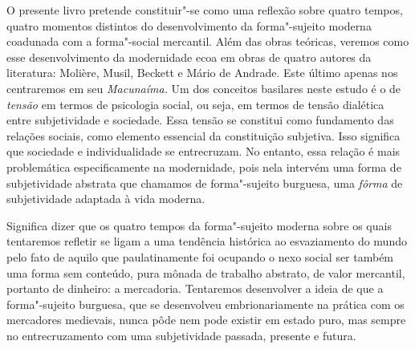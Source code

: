 O presente livro pretende constituir"-se como uma reflexão sobre quatro
tempos, quatro momentos distintos do desenvolvimento da forma"-sujeito
moderna coadunada com a forma"-social mercantil. Além das obras teóricas,
veremos como esse desenvolvimento da modernidade ecoa em obras de quatro
autores da literatura: Molière, Musil, Beckett e Mário de Andrade. Este
último apenas nos centraremos em seu \emph{Macunaíma.} Um dos conceitos
basilares neste estudo é o de \emph{tensão} em termos de psicologia
social, ou seja, em termos de tensão dialética entre subjetividade e
sociedade. Essa tensão se constitui como fundamento das relações
sociais, como elemento essencial da constituição subjetiva. Isso
significa que sociedade e individualidade se entrecruzam. No entanto,
essa relação é mais problemática especificamente na modernidade, pois
nela intervém uma forma de subjetividade abstrata que chamamos de
forma"-sujeito burguesa, uma \emph{fôrma} de subjetividade adaptada à
vida moderna.

Significa dizer que os quatro tempos da forma"-sujeito moderna sobre os
quais tentaremos refletir se ligam a uma tendência histórica ao
esvaziamento do mundo pelo fato de aquilo que paulatinamente foi
ocupando o nexo social ser também uma forma sem conteúdo, pura mônada de
trabalho abstrato, de valor mercantil, portanto de dinheiro: a
mercadoria. Tentaremos desenvolver a ideia de que a forma"-sujeito
burguesa, que se desenvolveu embrionariamente na prática com os
mercadores medievais, nunca pôde nem pode existir em estado puro, mas
sempre no entrecruzamento com uma subjetividade passada, presente e
futura.

